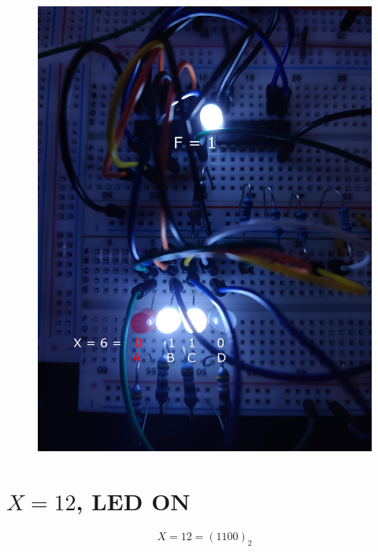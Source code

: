 \documentclass{article}
\begin{document}
\begin{figure}[ht!]
    \centering
    \includegraphics[width=\textwidth]{X_6_0110.jpg}
\end{figure}

\pagebreak

\section{$X=12$, LED ON}
$$X=12=(1100)_2$$
\end{document}
